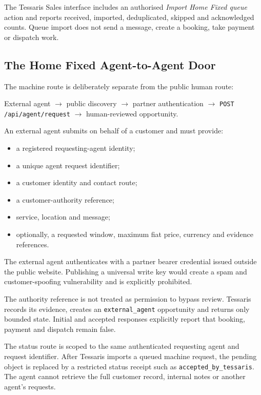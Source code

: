 The Tessaris Sales interface includes an authorised \emph{Import Home Fixed queue} action and reports received, imported, deduplicated, skipped and acknowledged counts.  Queue import does not send a message, create a booking, take payment or dispatch work.

\subsection{The Home Fixed Agent-to-Agent Door}

The machine route is deliberately separate from the public human route:

\begin{center}
External agent $\rightarrow$ public discovery $\rightarrow$ partner authentication $\rightarrow$ \texttt{POST /api/agent/request} $\rightarrow$ human-reviewed opportunity.
\end{center}

An external agent submits on behalf of a customer and must provide:

\begin{itemize}
  \item a registered requesting-agent identity;
  \item a unique agent request identifier;
  \item a customer identity and contact route;
  \item a customer-authority reference;
  \item service, location and message;
  \item optionally, a requested window, maximum fiat price, currency and evidence references.
\end{itemize}

The external agent authenticates with a partner bearer credential issued outside the public website.  Publishing a universal write key would create a spam and customer-spoofing vulnerability and is explicitly prohibited.

The authority reference is not treated as permission to bypass review.  Tessaris records its evidence, creates an \texttt{external\_agent} opportunity and returns only bounded state.  Initial and accepted responses explicitly report that booking, payment and dispatch remain false.

The status route is scoped to the same authenticated requesting agent and request identifier.  After Tessaris imports a queued machine request, the pending object is replaced by a restricted status receipt such as \texttt{accepted\_by\_tessaris}.  The agent cannot retrieve the full customer record, internal notes or another agent's requests.

